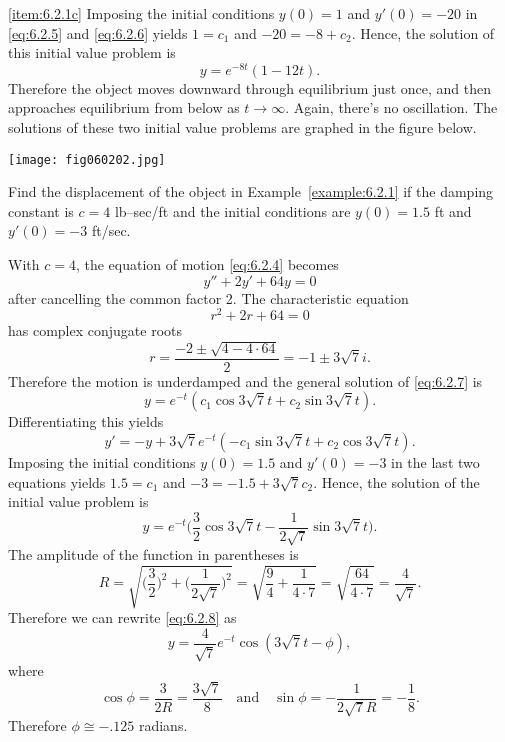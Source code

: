 \documentclass{ximera}
\begin{document}
\begin{example}
\begin{explanation}
\ref{item:6.2.1c}
Imposing the initial conditions $y(0)=1$ and $y'(0)=-20$ in
\eqref{eq:6.2.5} and \eqref{eq:6.2.6} yields $1=c_1$ and $-20=-8+c_2$. Hence,
the solution of this initial value problem is
$$
y=e^{-8t}(1-12t).
$$
Therefore the object moves downward through equilibrium just once,
and then approaches equilibrium from below as $t\rightarrow\infty$. Again,
there's no oscillation. The solutions of these two initial value
problems are graphed in the figure below.
 
\begin{image}
  \texttt{[image: fig060202.jpg]}
\end{image}
 
\end{explanation}
\end{example}
 
\begin{example}
\label{example:6.2.2}
Find the displacement of the object in Example~\ref{example:6.2.1} if the
damping constant is $c=4$ lb--sec/ft and the initial conditions are
$y(0)=1.5$ ft and $y'(0)=-3$ ft/sec.
 
\begin{explanation}
With $c=4$, the equation of motion \eqref{eq:6.2.4} becomes
\begin{equation}\label{eq:6.2.7}
y''+2y'+64y=0
\end{equation}
after cancelling the common factor 2. The characteristic equation
$$
r^2+2r+64=0
$$
has complex conjugate roots
$$
r=\frac{-2\pm\sqrt{4-4\cdot64}}{2}=-1\pm3\sqrt7i.
$$
Therefore the motion is underdamped and the
general solution of  \eqref{eq:6.2.7} is
$$
y=e^{-t}(c_1\cos3\sqrt7t+c_2\sin3\sqrt7t).
$$
Differentiating this yields
$$
y'=-y+3\sqrt7e^{-t}(-c_1\sin3\sqrt7t+c_2\cos3\sqrt7t).
$$
Imposing the initial conditions $y(0)=1.5$ and $y'(0)=-3$ in the last
two equations yields $1.5=c_1$ and $-3=-1.5+3\sqrt7c_2$. Hence, the
solution of the initial value problem is
\begin{equation}\label{eq:6.2.8}
y=e^{-t}\bigg(\frac{3}{2}\cos3\sqrt7t-\frac{1}{2\sqrt7}
\sin3\sqrt7t\bigg).
\end{equation}
 The amplitude of the function in parentheses is
$$
 R=\sqrt{\bigg(\frac{3}{2}\bigg)^2+\bigg(\frac{1}{2\sqrt7}\bigg)^2}
=\sqrt{\frac{9}{4}+\frac{1}{4\cdot7}}
=\sqrt{\frac{64}{4\cdot7}}=\frac{4}{\sqrt7}.
$$
Therefore we can rewrite  \eqref{eq:6.2.8} as
$$
y=\frac{4}{\sqrt7}e^{-t}\cos(3\sqrt7t-\phi),
$$
 where
$$
\cos\phi=\frac{3}{2R}=\frac{3\sqrt{7}}{8}\quad\mbox{and}\quad\sin\phi=-\frac{1}{2\sqrt{7}R}=
-\frac{1}{8}.
$$
Therefore $\phi\cong-.125$  radians.
\end{explanation}
\end{example}
 
\end{document}
